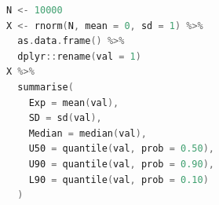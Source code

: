 \begin{lstlisting}[language=c++,label={code:17_06},caption={確率分布の要約}]
N <- 10000
X <- rnorm(N, mean = 0, sd = 1) %>%
  as.data.frame() %>%
  dplyr::rename(val = 1)
X %>%
  summarise(
    Exp = mean(val),
    SD = sd(val),
    Median = median(val),
    U50 = quantile(val, prob = 0.50),
    U90 = quantile(val, prob = 0.90),
    L90 = quantile(val, prob = 0.10)
  )
\end{lstlisting}
